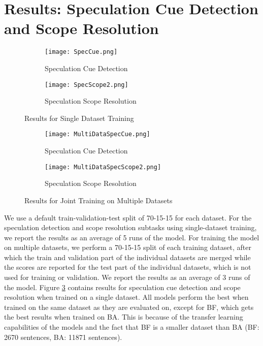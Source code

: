 \documentclass[runningheads]{llncs}
\begin{document}
\section{Results: Speculation Cue Detection and Scope Resolution}
\begin{figure}[!htb]
\begin{subfigure}{0.42\textwidth}
    \texttt{[image: SpecCue.png]}
    \caption{Speculation Cue Detection}
    \label{fig:speccue}
\end{subfigure}
\begin{subfigure}{0.58\textwidth}
    \texttt{[image: SpecScope2.png]}
    \caption{Speculation Scope Resolution}
    \label{fig:specscope}
\end{subfigure}

\caption{Results for Single Dataset Training}
\label{fig:spec}
\end{figure}
\begin{figure}[!htb]
\begin{subfigure}{0.43\textwidth}
    \texttt{[image: MultiDataSpecCue.png]}
    \caption{Speculation Cue Detection}
    \label{fig:multidataspeccue}
\end{subfigure}
\begin{subfigure}{0.57\textwidth}
    \texttt{[image: MultiDataSpecScope2.png]}
    \caption{Speculation Scope Resolution}
    \label{fig:multidataspecscope}
\end{subfigure}

\caption{Results for Joint Training on Multiple Datasets}
\label{fig:multidata}
\end{figure}
\noindent
\par We use a default train-validation-test split of 70-15-15 for each dataset. For the speculation detection and scope resolution subtasks using single-dataset training, we report the results as an average of 5 runs of the model. For training the model on multiple datasets, we perform a 70-15-15 split of each training dataset, after which the train and validation part of the individual datasets are merged while the scores are reported for the test part of the individual datasets, which is not used for training or validation. We report the results as an average of 3 runs of the model. Figure \ref{fig:spec} contains results for speculation cue detection and scope resolution when trained on a single dataset.
All models perform the best when trained on the same dataset as they are evaluated on, except for BF, which gets the best results when trained on BA. This is because of the transfer learning capabilities of the models and the fact that BF is a smaller dataset than BA (BF: 2670 sentences, BA: 11871 sentences).
\end{document}
